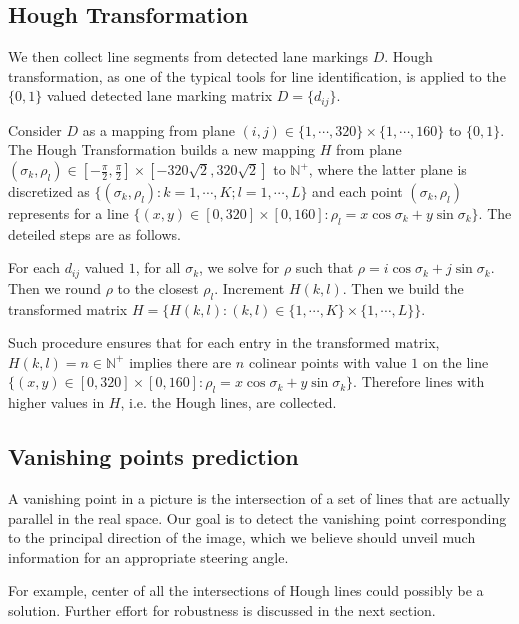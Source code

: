 \documentclass[11pt, oneside]{article}
\begin{document}
\subsection*{Hough Transformation}

We then collect line segments from detected lane markings $D$.  Hough transformation, as one of the typical tools for line identification, is applied to the $\{0, 1\}$ valued detected lane marking matrix $D = \{d_{ij}\}$. 

Consider $D$ as a mapping from plane $(i, j) \in \{1, \cdots, 320\} \times \{1, \cdots, 160\}$ to $\{0, 1\}$. The Hough Transformation builds a new mapping $H$ from plane $(\sigma_k, \rho_l) \in [-\frac{\pi}{2}, \frac{\pi}{2}] \times [-320\sqrt{2}, 320\sqrt{2}]$ to $\mathbb{N}^+$, where the latter plane is discretized as $\{(\sigma_k, \rho_l): k = 1, \cdots, K; l = 1, \cdots, L \}$ and each point $(\sigma_k, \rho_l)$ represents for a line $\{(x, y)\in [0, 320] \times [0, 160]: \rho_l = x\cos\sigma_k + y\sin\sigma_k\}$. The deteiled steps are as follows. 

For each $d_{ij}$ valued $1$, for all $\sigma_k$, we solve for $\rho$ such that $\rho = i \cos \sigma_k + j \sin \sigma_k$. Then we round $\rho$ to the closest $\rho_l$. Increment $H(k, l)$. Then we build the transformed matrix $H = \{H(k, l): (k,l) \in \{1, \cdots, K\}\times\{1, \cdots, L\}\}$. 

Such procedure ensures that for each entry in the transformed matrix, $H(k, l) = n \in \mathbb{N}^+$  implies there are $n$ colinear points with value $1$ on the line  $\{(x, y)\in [0, 320] \times [0, 160]: \rho_l = x\cos\sigma_k + y\sin\sigma_k\}$. Therefore lines with higher values in $H$, i.e. the Hough lines, are collected. 


\subsection*{Vanishing points prediction}

A vanishing point in a picture is the intersection of a set of lines that are actually parallel in the real space. Our goal is to detect the vanishing point corresponding to the principal direction of the image, which we believe should unveil much information for an appropriate steering angle. 

For example, center of all the intersections of Hough lines could possibly be a solution. Further effort for robustness is discussed in the next section. 
\end{document}
